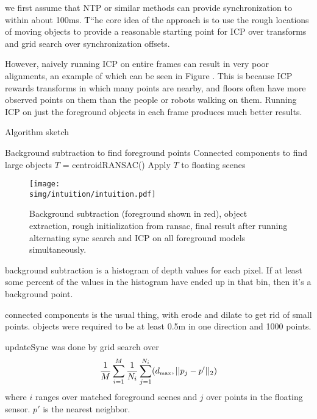 \documentclass[letterpaper, 10 pt, conference]{ieeeconf}  %
\newcommand{\simg}{static_img}
\begin{document}
 we first assume that NTP or similar methods can provide synchronization to within about 100ms.  T``he core idea of the approach is to use the rough locations of moving objects to provide a reasonable starting point for ICP over transforms and grid search over synchronization offsets.

However, naively running ICP on entire frames can result in very poor alignments, an example of which can be seen in Figure .  This is because ICP rewards transforms in which many points are nearby, and floors often have more observed points on them than the people or robots walking on them.  Running ICP on just the foreground objects in each frame produces much better results.


\begin{algorithm}
  \caption{Algorithm sketch}
  \label{alg:sketch}
  \SetLine
  \phantom{\;}
  Background subtraction to find foreground points\;
  Connected components to find large objects\;
  $T$ = centroidRANSAC()\;
  Apply $T$ to floating scenes\;
\end{algorithm}

\begin{figure*}
  \centering
  \texttt{[image: \\simg/intuition/intuition.pdf]}
  \caption{Background subtraction (foreground shown in red), object extraction, rough initialization from ransac, final result after running alternating sync search and ICP on all foreground models simultaneously. }
  \label{fig:}
\end{figure*}


background subtraction is a histogram of depth values for each pixel.  If at least some percent of the values in the histogram have ended up in that bin, then it's a background point.

connected components is the usual thing, with erode and dilate to get rid of small points.  objects were required to be at least 0.5m in one direction and 1000 points.

updateSync was done by grid search over
\newcommand{\dmax}{d_{\mbox{\tiny{max}}}}
\begin{align*}
  \frac{1}{M} \sum_{i=1}^M \frac{1}{N_i} \sum_{j=1}^{N_i}    (\dmax, ||p_j - p'||_2)
\end{align*}
where $i$ ranges over matched foreground scenes and $j$ over points in the floating sensor.  $p'$ is the nearest neighbor.
\end{document}
